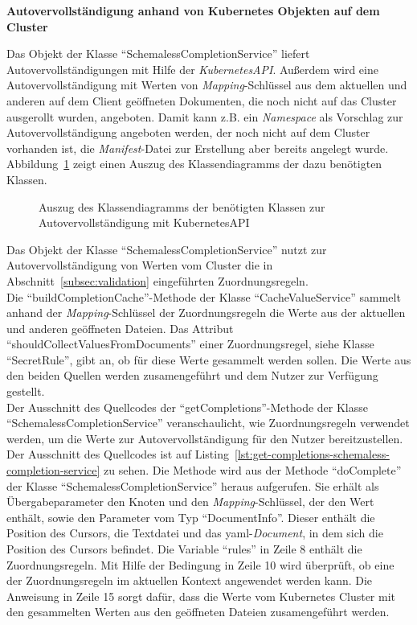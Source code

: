 \textbf{Autovervollständigung anhand von Kubernetes Objekten auf dem Cluster}

Das Objekt der Klasse ``SchemalessCompletionService'' liefert Autovervollständigungen mit Hilfe der \textit{KubernetesAPI}.
Außerdem wird eine Autovervollständigung
mit Werten von \textit{Mapping}-Schlüssel aus dem aktuellen und anderen auf dem Client geöffneten Dokumenten,
die noch nicht auf das Cluster ausgerollt wurden, angeboten.
Damit kann z.B. ein \textit{Namespace} als Vorschlag zur Autovervollständigung angeboten werden, der noch nicht auf dem Cluster vorhanden ist,
die \textit{Manifest}-Datei zur Erstellung aber bereits angelegt wurde.
Abbildung~\ref{fig:class-diagram-yaml-language-service-schemaless-completion} zeigt einen Auszug des Klassendiagramms der dazu benötigten Klassen.

\begin{figure}[htp] %
  \centering
  \caption{Auszug des Klassendiagramms der benötigten Klassen zur Autovervollständigung mit KubernetesAPI}
  \label{fig:class-diagram-yaml-language-service-schemaless-completion}
\end{figure}

Das Objekt der Klasse ``SchemalessCompletionService'' nutzt zur Autovervollständigung von Werten vom Cluster die
in Abschnitt~\ref{subsec:validation} eingeführten Zuordnungsregeln.
\\
Die ``buildCompletionCache''-Methode der Klasse ``CacheValueService'' sammelt anhand der \textit{Mapping}-Schlüssel
der Zuordnungsregeln die Werte aus der aktuellen und anderen geöffneten Dateien.
Das Attribut ``shouldCollectValuesFromDocuments'' einer Zuordnungsregel, siehe Klasse ``SecretRule'', gibt an,
ob für diese Werte gesammelt werden sollen.
Die Werte aus den beiden Quellen werden zusamengeführt und dem Nutzer zur Verfügung gestellt.
\\
Der Ausschnitt des Quellcodes der ``getCompletions''-Methode der Klasse ``SchemalessCompletionService'' veranschaulicht,
wie Zuordnungsregeln verwendet werden, um die Werte zur Autovervollständigung für den Nutzer bereitzustellen.
Der Ausschnitt des Quellcodes ist auf Listing~\ref{lst:get-completions-schemaless-completion-service} zu sehen. Die Methode wird aus der Methode ``doComplete'' der Klasse ``SchemalessCompletionService'' heraus aufgerufen.
Sie erhält als Übergabeparameter den Knoten und den \textit{Mapping}-Schlüssel, der den Wert enthält, sowie den Parameter vom Typ
``DocumentInfo''. Dieser enthält die Position des Cursors, die Textdatei und das \ac{yaml}-\textit{Document}, in dem sich die
Position des Cursors befindet. Die Variable ``rules'' in Zeile 8 enthält die Zuordnungsregeln.
Mit Hilfe der Bedingung in Zeile 10 wird überprüft, ob eine der Zuordnungsregeln im aktuellen Kontext angewendet werden kann.
Die Anweisung in Zeile 15 sorgt dafür, dass die Werte vom Kubernetes Cluster mit den gesammelten Werten
aus den geöffneten Dateien zusamengeführt werden.

